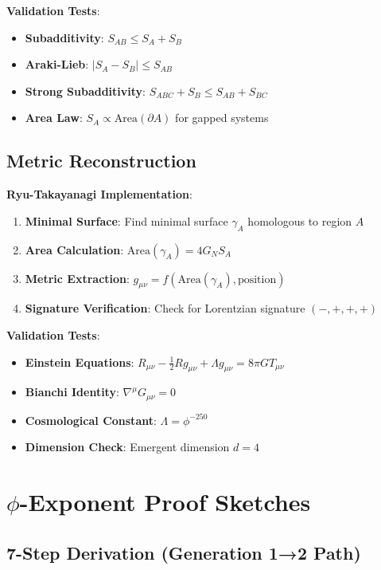 \documentclass[11pt]{article}
\theoremstyle{definition}
\newcommand{\goldenratio}{\phi}
\begin{document}
\textbf{Validation Tests}:
\begin{itemize}
\item \textbf{Subadditivity}: $S_{AB} \leq S_A + S_B$
\item \textbf{Araki-Lieb}: $|S_A - S_B| \leq S_{AB}$
\item \textbf{Strong Subadditivity}: $S_{ABC} + S_B \leq S_{AB} + S_{BC}$
\item \textbf{Area Law}: $S_A \propto \text{Area}(\partial A)$ for gapped systems
\end{itemize}

\subsection{Metric Reconstruction}

\textbf{Ryu-Takayanagi Implementation}:
\begin{enumerate}
\item \textbf{Minimal Surface}: Find minimal surface $\gamma_A$ homologous to region $A$
\item \textbf{Area Calculation}: $\text{Area}(\gamma_A) = 4G_N S_A$
\item \textbf{Metric Extraction}: $g_{\mu\nu} = f(\text{Area}(\gamma_A), \text{position})$
\item \textbf{Signature Verification}: Check for Lorentzian signature $(-,+,+,+)$
\end{enumerate}

\textbf{Validation Tests}:
\begin{itemize}
\item \textbf{Einstein Equations}: $R_{\mu\nu} - \frac{1}{2}Rg_{\mu\nu} + \Lambda g_{\mu\nu} = 8\pi G T_{\mu\nu}$
\item \textbf{Bianchi Identity}: $\nabla^\mu G_{\mu\nu} = 0$
\item \textbf{Cosmological Constant}: $\Lambda = \goldenratio^{-250}$
\item \textbf{Dimension Check}: Emergent dimension $d = 4$
\end{itemize}

\section{$\goldenratio$-Exponent Proof Sketches}

\subsection{7-Step Derivation (Generation 1→2 Path)}
\end{document}
